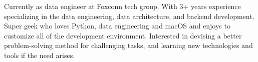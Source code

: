 

\begin{cvparagraph}

Currently as data engineer at Foxconn tech group. With 3+ years experience specializing in the data engineering, data architecture, and backend development. Super geek who loves Python, data engineering and macOS and enjoys to customize all of the development environment. Interested in devising a better problem-solving method for challenging tasks, and learning new technologies and tools if the need arises.
\end{cvparagraph}
